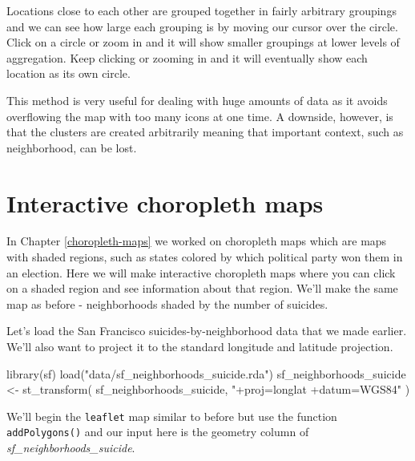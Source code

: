 \documentclass[
]{krantz}
\makeatletter
\newenvironment{Shaded}{\begin{snugshade}}{\end{snugshade}}
\newcommand{\AttributeTok}[1]{\textcolor[rgb]{0.61,0.61,0.61}{#1}}
\newcommand{\FunctionTok}[1]{\textcolor[rgb]{0,0,0}{#1}}
\newcommand{\NormalTok}[1]{#1}
\newcommand{\OtherTok}[1]{\textcolor[rgb]{0.37,0.37,0.37}{#1}}
\newcommand{\SpecialCharTok}[1]{\textcolor[rgb]{0,0,0}{#1}}
\newcommand{\StringTok}[1]{\textcolor[rgb]{0.5,0.5,0.5}{#1}}
\newenvironment{kframe}{%
\medskip{}
\setlength{\fboxsep}{.8em}
 \def\at@end@of@kframe{}%
 \ifinner\ifhmode%
  \def\at@end@of@kframe{\end{minipage}}%
  \begin{minipage}{\columnwidth}%
 \fi\fi%
 \def\FrameCommand##1{\hskip\@totalleftmargin \hskip-\fboxsep
 \colorbox{shadecolor}{##1}\hskip-\fboxsep
     \hskip-\linewidth \hskip-\@totalleftmargin \hskip\columnwidth}%
 \MakeFramed {\advance\hsize-\width
   \@totalleftmargin\z@ \linewidth\hsize
   \@setminipage}}%
 {\par\unskip\endMakeFramed%
 \at@end@of@kframe}
\renewenvironment{Shaded}{\begin{kframe}}{\end{kframe}}
\makeatother
\begin{document}
Locations close to each other are grouped together in fairly
arbitrary groupings and we can see how large each grouping
is by moving our cursor over the circle. Click on a circle
or zoom in and it will show smaller groupings at lower
levels of aggregation. Keep clicking or zooming in and it
will eventually show each location as its own circle.

This method is very useful for dealing with huge amounts of
data as it avoids overflowing the map with too many icons at
one time. A downside, however, is that the clusters are
created arbitrarily meaning that important context, such as
neighborhood, can be lost.

\hypertarget{interactive-choropleth-maps}{%
\section{Interactive choropleth
maps}\label{interactive-choropleth-maps}}

In Chapter \ref{choropleth-maps} we worked on choropleth
maps which are maps with shaded regions, such as states
colored by which political party won them in an election.
Here we will make interactive choropleth maps where you can
click on a shaded region and see information about that
region. We'll make the same map as before - neighborhoods
shaded by the number of suicides.

Let's load the San Francisco suicides-by-neighborhood data
that we made earlier. We'll also want to project it to the
standard longitude and latitude projection.

\begin{Shaded}
\begin{Highlighting}[]
\FunctionTok{library}\NormalTok{(sf)}
\FunctionTok{load}\NormalTok{(}\StringTok{"data/sf\_neighborhoods\_suicide.rda"}\NormalTok{)}
\NormalTok{sf\_neighborhoods\_suicide }\OtherTok{\textless{}{-}} \FunctionTok{st\_transform}\NormalTok{(}
\NormalTok{  sf\_neighborhoods\_suicide,}
  \StringTok{"+proj=longlat +datum=WGS84"}
\NormalTok{)}
\end{Highlighting}
\end{Shaded}

We'll begin the \texttt{leaflet} map similar to before but
use the function \texttt{addPolygons()} and our input here
is the geometry column of \emph{sf\_neighborhoods\_suicide}.

\begin{Shaded}
\end{Shaded}
\end{document}
